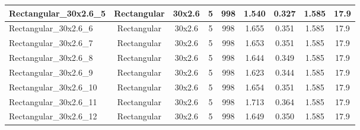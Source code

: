 \begin{table}
\begin{adjustbox}{max width = \linewidth}
\begin{tabular}{lcccccccc}
\multicolumn{1}{|l|}{Rectangular\_30x2.6\_5} & \multicolumn{1}{c|}{Rectangular} & \multicolumn{1}{c|}{30x2.6} & \multicolumn{1}{c|}{5} & \multicolumn{1}{c|}{998} & \multicolumn{1}{c|}{1.540} & \multicolumn{1}{c|}{0.327} & \multicolumn{1}{c|}{1.585} & \multicolumn{1}{c|}{17.9} \\ \hline
\multicolumn{1}{|l|}{Rectangular\_30x2.6\_6} & \multicolumn{1}{c|}{Rectangular} & \multicolumn{1}{c|}{30x2.6} & \multicolumn{1}{c|}{5} & \multicolumn{1}{c|}{998} & \multicolumn{1}{c|}{1.655} & \multicolumn{1}{c|}{0.351} & \multicolumn{1}{c|}{1.585} & \multicolumn{1}{c|}{17.9} \\ \hline
\multicolumn{1}{|l|}{Rectangular\_30x2.6\_7} & \multicolumn{1}{c|}{Rectangular} & \multicolumn{1}{c|}{30x2.6} & \multicolumn{1}{c|}{5} & \multicolumn{1}{c|}{998} & \multicolumn{1}{c|}{1.653} & \multicolumn{1}{c|}{0.351} & \multicolumn{1}{c|}{1.585} & \multicolumn{1}{c|}{17.9} \\ \hline
\multicolumn{1}{|l|}{Rectangular\_30x2.6\_8} & \multicolumn{1}{c|}{Rectangular} & \multicolumn{1}{c|}{30x2.6} & \multicolumn{1}{c|}{5} & \multicolumn{1}{c|}{998} & \multicolumn{1}{c|}{1.644} & \multicolumn{1}{c|}{0.349} & \multicolumn{1}{c|}{1.585} & \multicolumn{1}{c|}{17.9} \\ \hline
\multicolumn{1}{|l|}{Rectangular\_30x2.6\_9} & \multicolumn{1}{c|}{Rectangular} & \multicolumn{1}{c|}{30x2.6} & \multicolumn{1}{c|}{5} & \multicolumn{1}{c|}{998} & \multicolumn{1}{c|}{1.623} & \multicolumn{1}{c|}{0.344} & \multicolumn{1}{c|}{1.585} & \multicolumn{1}{c|}{17.9} \\ \hline
\multicolumn{1}{|l|}{Rectangular\_30x2.6\_10} & \multicolumn{1}{c|}{Rectangular} & \multicolumn{1}{c|}{30x2.6} & \multicolumn{1}{c|}{5} & \multicolumn{1}{c|}{998} & \multicolumn{1}{c|}{1.654} & \multicolumn{1}{c|}{0.351} & \multicolumn{1}{c|}{1.585} & \multicolumn{1}{c|}{17.9} \\ \hline
\multicolumn{1}{|l|}{Rectangular\_30x2.6\_11} & \multicolumn{1}{c|}{Rectangular} & \multicolumn{1}{c|}{30x2.6} & \multicolumn{1}{c|}{5} & \multicolumn{1}{c|}{998} & \multicolumn{1}{c|}{1.713} & \multicolumn{1}{c|}{0.364} & \multicolumn{1}{c|}{1.585} & \multicolumn{1}{c|}{17.9} \\ \hline
\multicolumn{1}{|l|}{Rectangular\_30x2.6\_12} & \multicolumn{1}{c|}{Rectangular} & \multicolumn{1}{c|}{30x2.6} & \multicolumn{1}{c|}{5} & \multicolumn{1}{c|}{998} & \multicolumn{1}{c|}{1.649} & \multicolumn{1}{c|}{0.350} & \multicolumn{1}{c|}{1.585} & \multicolumn{1}{c|}{17.9} \\ \hline

\end{tabular}
\end{adjustbox}
\end{table}
